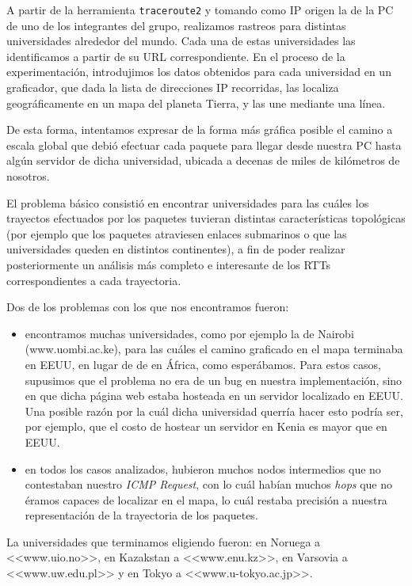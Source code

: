 \documentclass[final,inline,a4paper,narroweqnarray]{ieee}
\begin{document}
A partir de la herramienta \texttt{traceroute2} y tomando como IP origen la de la PC de uno de los integrantes del grupo,
realizamos rastreos para distintas universidades alrededor del mundo. Cada una de estas universidades las identificamos
a partir de su URL correspondiente. 
En el proceso de la experimentación, introdujimos los datos obtenidos para cada universidad en un graficador, que 
dada la lista de direcciones IP recorridas, las localiza geográficamente en un mapa del planeta Tierra, 
y las une mediante una línea. 

De esta forma, intentamos expresar de la forma más gráfica posible el camino a 
escala global que debió efectuar cada paquete para llegar desde nuestra PC hasta algún servidor de dicha universidad, 
ubicada a decenas de miles de kilómetros de nosotros. 

El problema básico consistió en encontrar universidades para las cuáles los trayectos efectuados por los paquetes 
tuvieran distintas características topológicas (por ejemplo que los paquetes atraviesen enlaces submarinos o que
las universidades queden en distintos continentes), a fin 
de poder realizar posteriormente un análisis más completo e interesante de los RTTs correspondientes a cada trayectoria.  

Dos de los problemas con los que nos encontramos fueron:
\begin{itemize}
	\item encontramos muchas universidades, como por ejemplo la de Nairobi (www.uombi.ac.ke), 
para las cuáles el camino graficado en el mapa terminaba en EEUU, en lugar de de en África, como esperábamos. Para estos
casos, supusimos que el problema no era de un bug en nuestra implementación, sino en que dicha página web estaba hosteada
en un servidor localizado en EEUU. Una posible razón por la cuál dicha universidad querría hacer esto podría ser, por 
ejemplo, que el costo de hostear un servidor en Kenia es mayor que en EEUU.
	\item en todos los casos analizados, hubieron muchos nodos intermedios que no contestaban nuestro \emph{ICMP Request}, con
lo cuál habían muchos \emph{hops} que no éramos capaces de localizar en el mapa, lo cuál restaba precisión a nuestra 
representación de la trayectoria de los paquetes.
\end{itemize}

La universidades que terminamos eligiendo fueron: en Noruega a <<www.uio.no>>, en Kazakstan a
 <<www.enu.kz>>, en Varsovia a <<www.uw.edu.pl>> y en Tokyo a <<www.u-tokyo.ac.jp>>.
\end{document}
